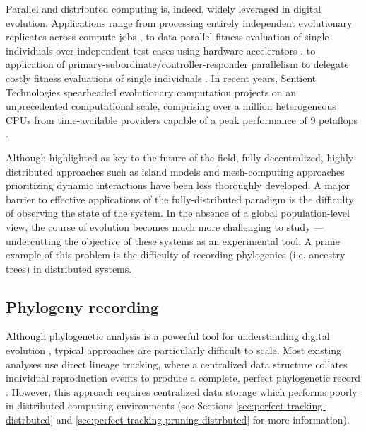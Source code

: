 Parallel and distributed computing is, indeed, widely leveraged in digital evolution.
Applications range from processing entirely independent evolutionary replicates across compute jobs \citep{dolson2017spatial, hornby2006automated}, to data-parallel fitness evaluation of single individuals over independent test cases using hardware accelerators \citep{harding2007fast_springer, langdon2019continuous}, to application of primary-subordinate/controller-responder parallelism to delegate costly fitness evaluations of single individuals \citep{cantu2001master,miikkulainen2019evolving}.
In recent years, Sentient Technologies spearheaded evolutionary computation projects on an unprecedented computational scale, comprising over a million heterogeneous CPUs from time-available providers capable of a peak performance of 9 petaflops \citep{miikkulainen2019evolving,gilbert2015artificial,blondeau2009distributed}.

Although highlighted as key to the future of the field, fully decentralized, highly-distributed approaches such as island models \citep{bennett1999building,schulte2010genetic} and mesh-computing approaches prioritizing dynamic interactions \citep{ray1995proposal,ackley2018digital,moreno2021conduit} have been less thoroughly developed.
A major barrier to effective applications of the fully-distributed paradigm is the difficulty of observing the state of the system.
In the absence of a global population-level view, the course of evolution becomes much more challenging to study --- undercutting the objective of these systems as an experimental tool.
A prime example of this problem is the difficulty of recording phylogenies (i.e. ancestry trees) in distributed systems.

\subsection{Phylogeny recording}

Although phylogenetic analysis is a powerful tool for understanding digital evolution \citep{dolson2020interpreting}, typical approaches are particularly difficult to scale. %
Most existing analyses use direct lineage tracking, where a centralized data structure collates individual reproduction events to produce a complete, perfect phylogenetic record \citep{dolson2023phylotrackpy}.
However, this approach requires centralized data storage which performs poorly in distributed computing environments (see Sections \ref{sec:perfect-tracking-distrbuted} and \ref{sec:perfect-tracking-pruning-distrbuted} for more information).

